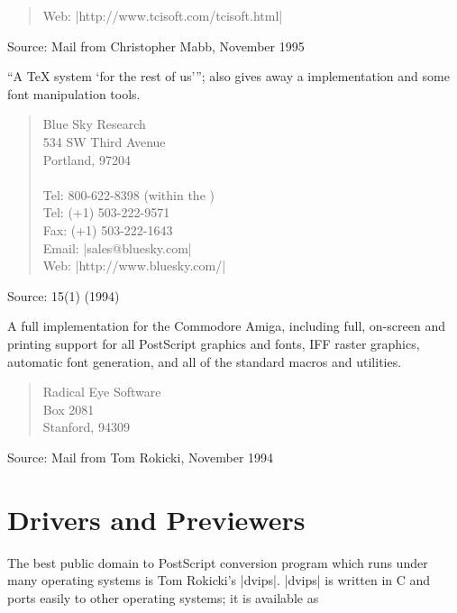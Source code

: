 \begin{description}
\begin{quote}
    Web: \URL|http://www.tcisoft.com/tcisoft.html|
  \end{quote}
  Source: Mail from Christopher Mabb, November 1995
\item[Macintosh; Textures] ``A \TeX{} system `for the rest of
  us'\thinspace''; also gives away a \MF{} implementation and some
  font manipulation tools.
  \begin{quote}
    Blue Sky Research\\
    534 SW Third Avenue\\
    Portland,  97204\\
    \\[.25\baselineskip]
    Tel: 800-622-8398 (within the )\\
    Tel: (+1) 503-222-9571\\
    Fax: (+1) 503-222-1643\\
    Email: \Email|sales@bluesky.com|\\
    Web: \URL|http://www.bluesky.com/|
  \end{quote}
  Source: \TUGboat{} 15(1) (1994)
\item[Amiga\TeX{}] A full implementation for the Commodore Amiga,
  including full, on-screen and printing support for all PostScript
  graphics and fonts, IFF raster graphics, automatic font generation,
  and all of the standard macros and utilities.
  \begin{quote}
    Radical Eye Software\\
     Box 2081\\
    Stanford,  94309\\
  \end{quote}
  Source: Mail from Tom Rokicki, November 1994
\end{description}
%
%


\section{ Drivers and Previewers}


The best public domain  to PostScript conversion program which
runs under many operating systems is Tom Rokicki's \ProgName|dvips|.
\ProgName|dvips| is written in C and ports easily to other operating
systems; it is available as 

